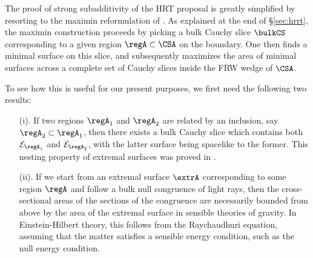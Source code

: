 \documentclass[12pt,openany]{book}
\begin{document}
The proof of strong subadditivity of the HRT proposal is greatly simplified by resorting to the maximin reformulation of \cite{Wall:2012uf}. As explained at the end of  \S\ref{sec:hrrt}, the maximin construction proceeds by picking a bulk Cauchy slice $\bulkCS$ corresponding to a given region $\regA \subset \CSA$ on the boundary. One then finds a minimal surface on this slice, and subsequently maximizes the area of minimal surfaces across a complete set of Cauchy slices inside the FRW wedge of $\CSA$.

To see how this is useful for our present purposes, we first need the following two results:
\begin{enumerate}
\item[(i).] If two regions $\regA_1$ and $\regA_2$ are related by an inclusion, say $\regA_2 \subset \regA_1$, then there exists a bulk Cauchy slice which contains both ${\cal E}_{\regA_1}$ and ${\cal E}_{\regA_2}$, with the latter surface being spacelike to the former. This nesting property of extremal surfaces was proved in \cite{Wall:2012uf}.
\item[(ii).] If we start from an extremal surface $\extrA$ corresponding to some region $\regA$ and follow a bulk null congruence of light rays, then the cross-sectional areas of the sections of the congruence are necessarily bounded from above by the area of the extremal surface in sensible theories of gravity. In Einstein-Hilbert theory, this follows from the Raychaudhuri equation, assuming that the matter satisfies a sensible energy condition, such as the null energy condition.
\end{enumerate}
\end{document}
